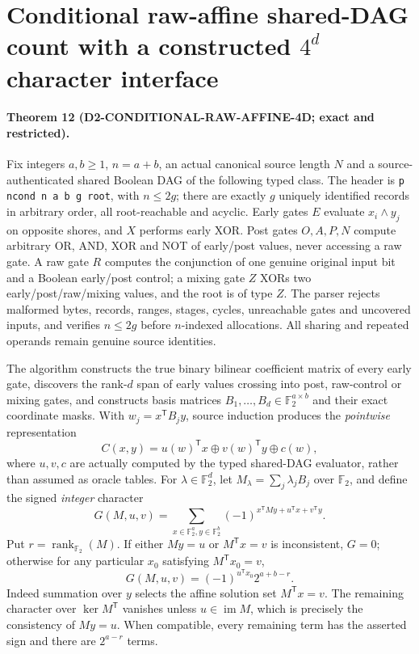 \documentclass[11pt]{article}
\begin{document}
\section{Conditional raw-affine shared-DAG count with a constructed $4^d$ character interface}
\paragraph{Theorem 12 (D2-CONDITIONAL-RAW-AFFINE-4D; exact and restricted).}
Fix integers $a,b\ge1$, $n=a+b$, an actual canonical source length $N$ and a source-authenticated shared Boolean DAG of the following typed class.
The header is \texttt{p ncond n a b g root}, with $n\le2g$; there are exactly $g$ uniquely identified records in arbitrary order, all root-reachable and acyclic.
Early gates $E$ evaluate $x_i\wedge y_j$ on opposite shores, and $X$ performs early XOR.
Post gates $O,A,P,N$ compute arbitrary OR, AND, XOR and NOT of early/post values, never accessing a raw gate.
A raw gate $R$ computes the conjunction of one genuine original input bit and a Boolean early/post control; a mixing gate $Z$ XORs two early/post/raw/mixing values, and the root is of type $Z$.
The parser rejects malformed bytes, records, ranges, stages, cycles, unreachable gates and uncovered inputs, and verifies $n\le2g$ before $n$-indexed allocations.
All sharing and repeated operands remain genuine source identities.

The algorithm constructs the true binary bilinear coefficient matrix of every early gate, discovers the rank-$d$ span of early values crossing into post, raw-control or mixing gates, and constructs basis matrices $B_1,\ldots,B_d\in\mathbb F_2^{a\times b}$ and their exact coordinate masks.
With $w_j=x^{\mathsf T}B_jy$, source induction produces the \emph{pointwise} representation
\[
C(x,y)=u(w)^{\mathsf T}x\oplus v(w)^{\mathsf T}y\oplus c(w),
\]
where $u,v,c$ are actually computed by the typed shared-DAG evaluator, rather than assumed as oracle tables.
For $\lambda\in\mathbb F_2^d$, let $M_\lambda=\sum_j\lambda_jB_j$ over $\mathbb F_2$, and define the signed \emph{integer} character
\[
G(M,u,v)=\sum_{x\in\mathbb F_2^a,y\in\mathbb F_2^b}
(-1)^{x^{\mathsf T}My+u^{\mathsf T}x+v^{\mathsf T}y}.
\]
Put $r=\operatorname{rank}_{\mathbb F_2}(M)$.
If either $My=u$ or $M^{\mathsf T}x=v$ is inconsistent, $G=0$; otherwise for any particular $x_0$ satisfying $M^{\mathsf T}x_0=v$,
\[
G(M,u,v)=(-1)^{u^{\mathsf T}x_0}2^{a+b-r}.
\]
Indeed summation over $y$ selects the affine solution set $M^{\mathsf T}x=v$.  The remaining character over $\ker M^{\mathsf T}$ vanishes unless $u\in\operatorname{im}M$, which is precisely the consistency of $My=u$.
When compatible, every remaining term has the asserted sign and there are $2^{a-r}$ terms.
\end{document}
